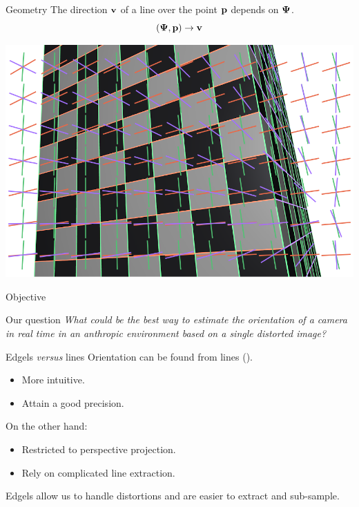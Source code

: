 \begin{frame}{Geometry}
  The direction ${\mathbf{v}}$ of a line over the point ${\mathbf{p}}$ depends on ${\boldsymbol{\Psi}}$.
  \[
  ({\boldsymbol{\Psi}},{\mathbf{p}}) \rightarrow {\mathbf{v}}
  \]

  \centerline{\includegraphics[height=10\baselineskip]{canim0117.png}}

  \hfill{}
\end{frame}




\begin{frame}{Objective}
  \begin{block}{Our question}
    {\em What could be the best way to estimate the orientation of a camera in
      \alert<2>{real time} in an anthropic environment based on a single
      \alert<2>{distorted image}?}
  \end{block}
\end{frame}


\begin{frame}{Edgels {\em versus} lines}
  Orientation can be found from lines
  (\cite{Caprile1990,Cipolla1999,Rother2002}).\\ %
  \begin{itemize}
  \item More intuitive.
  \item Attain a good precision.
  \end{itemize}

 On the other hand:\\
  \begin{itemize}
  \item Restricted to perspective projection.
  \item Rely on complicated line extraction.%
  \end{itemize}

  Edgels allow us to handle distortions and are easier to extract and sub-sample.
\end{frame}



